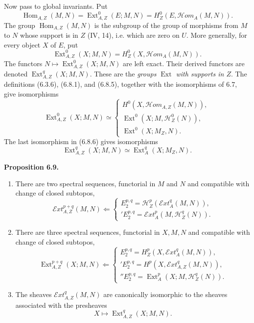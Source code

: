 \documentclass[11pt]{article}
\newcommand{\Hh}{\mathcal{H}}
\newcommand{\Hom}{\operatorname{Hom}}
\newcommand{\Ext}{\operatorname{Ext}}
\newcommand{\Hhom}{\mathcal{H}om}
\newcommand{\Eext}{\mathcal{E}xt}
\newenvironment{statement}[1]{\par\medskip\noindent\textbf{#1.}\ }{\par\medskip}
\begin{document}
Now pass to global invariants. Put
\begin{equation*}
        \Hom_{A,Z}(M,N)=\Ext_{A,Z}^0(E;M,N)=H_Z^0(E,\Hhom_A(M,N)).\tag{6.8.4}
\end{equation*}
The group $\Hom_{A,Z}(M,N)$ is the subgroup of the group of morphisms from $M$ to $N$ whose support is in $Z$ (IV, 14), i.e. which are zero on $U$. More generally, for every object $X$ of $E$, put
\begin{equation*}
        \Ext_{A,Z}^0(X;M,N)=H_Z^0(X,\Hhom_A(M,N)).\tag{6.8.5}
\end{equation*}
The functors $N\mapsto \Ext_{A,Z}^0(X;M,N)$ are left exact. Their derived functors are denoted $\Ext_{A,Z}^q(X;M,N)$. These are the \emph{groups $\Ext$ with supports in $Z$}. The definitions (6.3.6), (6.8.1), and (6.8.5), together with the isomorphisms of 6.7, give isomorphisms
\begin{equation*}
\Ext_{A,Z}^0(X;M,N)\simeq
\begin{cases}
H^0(X,\Hhom_{A,Z}(M,N)),\\[3pt]
\Ext^0(X;M,\Hh_Z^0(N)),\\[3pt]
\Ext^0(X;M_Z,N).
\end{cases}\tag{6.8.6}
\end{equation*}
The last isomorphism in (6.8.6) gives isomorphisms
\begin{equation*}
        \Ext_{A,Z}^q(X;M,N)\simeq \Ext_A^q(X;M_Z,N).\tag{6.8.7}
\end{equation*}

\begin{statement}{Proposition 6.9}
\begin{enumerate}[label=\arabic*)]
\item There are two spectral sequences, functorial in $M$ and $N$ and compatible with change of closed subtopos,
\begin{equation*}
\Eext_{A,Z}^{p+q}(M,N)\Longleftarrow
\begin{cases}
E_2^{p,q}=\Hh_Z^p(\Eext_A^q(M,N)),\\[3pt]
{}'E_2^{p,q}=\Eext_A^p(M,\Hh_Z^q(N)).
\end{cases}\tag{6.9.1}
\end{equation*}
\item There are three spectral sequences, functorial in $X,M,N$ and compatible with change of closed subtopos,
\begin{equation*}
\Ext_{A,Z}^{p+q}(X;M,N)\Longleftarrow
\begin{cases}
E_2^{p,q}=H_Z^p(X,\Eext_A^q(M,N)),\\[3pt]
{}'E_2^{p,q}=H^p(X,\Eext_{A,Z}^q(M,N)),\\[3pt]
{}''E_2^{p,q}=\Ext_A^p(X;M,\Hh_Z^q(N)).
\end{cases}\tag{6.9.2}
\end{equation*}
\item The sheaves $\Eext_{A,Z}^q(M,N)$ are canonically isomorphic to the sheaves associated with the presheaves
\[
        X\longmapsto \Ext_{A,Z}^q(X;M,N).
\]
\end{enumerate}
\end{statement}
\end{document}
